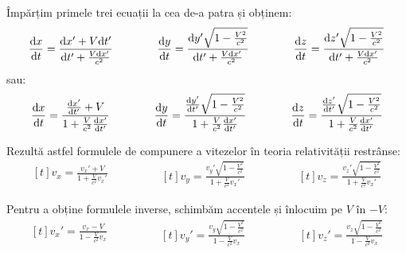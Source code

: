 \documentclass[a4paper, 12pt]{article}
\newcommand{\lorentzradical}{\sqrt{1 - \frac{V^2}{c^2}}}
\begin{document}
Împărțim primele trei ecuații la cea de-a patra și obținem:
\begin{equation*}
    \begin{aligned}[t]
        \dv{x}{t} = \frac{\dd x' + V\dd t'}{\dd t' + \frac{V\dd x'}{c^2}}
    \end{aligned}\qquad\qquad
    \begin{aligned}[t]
        \dv{y}{t} = \frac{\dd y'\lorentzradical}{\dd t' + \frac{V\dd x'}{c^2}}
    \end{aligned}\qquad\qquad
    \begin{aligned}[t]
        \dv{z}{t} = \frac{\dd z'\lorentzradical}{\dd t' + \frac{V\dd x'}{c^2}}
    \end{aligned}
\end{equation*}
sau:
\begin{equation*}
    \begin{aligned}[t]
        \dv{x}{t} = \frac{\dv{x'}{t'} + V}{1 + \frac{V}{c^2}\dv{x'}{t'}}
    \end{aligned}\qquad\qquad
    \begin{aligned}[t]
        \dv{y}{t} = \frac{\dv{y'}{t'}\lorentzradical}{1 + \frac{V}{c^2}\dv{x'}{t'}}
    \end{aligned}\qquad\qquad
    \begin{aligned}[t]
        \dv{z}{t} = \frac{\dv{z'}{t'}\lorentzradical}{1 + \frac{V}{c^2}\dv{x'}{t'}}
    \end{aligned}
\end{equation*}

Rezultă astfel formulele de compunere a vitezelor în teoria relativității
restrânse:
\begin{equation*}
    \begin{aligned}[t]
        v_x = \frac{v_x' + V}{1 + \frac{V}{c^2}v_x'}
    \end{aligned}\qquad\qquad
    \begin{aligned}[t]
        v_y = \frac{v_y'\lorentzradical}{1 + \frac{V}{c^2}v_x'}
    \end{aligned}\qquad\qquad
    \begin{aligned}[t]
        v_z = \frac{v_z'\lorentzradical}{1 + \frac{V}{c^2}v_x'}
    \end{aligned}
\end{equation*}

Pentru a obține formulele inverse, schimbăm accentele și înlocuim pe $V$ în
$-V$:
\begin{equation*}
    \begin{aligned}[t]
        v_x' = \frac{v_x - V}{1 - \frac{V}{c^2}v_x}
    \end{aligned}\qquad\qquad
    \begin{aligned}[t]
        v_y' = \frac{v_y\lorentzradical}{1 - \frac{V}{c^2}v_x}
    \end{aligned}\qquad\qquad
    \begin{aligned}[t]
        v_z' = \frac{v_z\lorentzradical}{1 - \frac{V}{c^2}v_x}
    \end{aligned}
\end{equation*}
\end{document}
